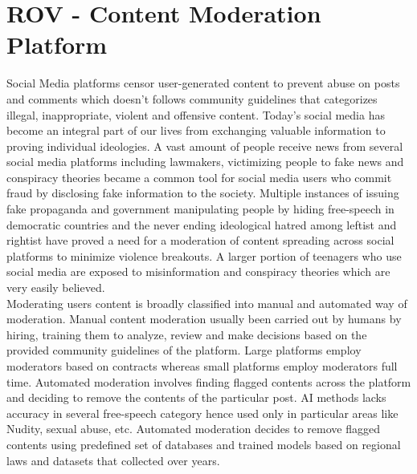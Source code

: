 \documentclass[conference]{IEEEtran}
\begin{document}
\section{\textbf{ROV - Content Moderation Platform}}

Social Media platforms censor user-generated content to prevent abuse on posts and comments which doesn't follows community guidelines that categorizes illegal, inappropriate, violent and offensive content.  Today's social media has become an integral part of our lives from exchanging valuable information to proving individual ideologies. A vast amount of people receive news from several social media platforms including lawmakers, victimizing people to fake news and conspiracy theories became a common tool for social media users who commit fraud by disclosing fake information to the society. Multiple instances of issuing fake propaganda and government manipulating people by hiding free-speech in democratic countries and the never ending ideological hatred among leftist and rightist have proved a need for a moderation of content spreading across social platforms to minimize violence breakouts. A larger portion of teenagers who use social media are exposed to misinformation and conspiracy theories which are very easily believed.\\

Moderating users content is broadly classified into manual and automated way of moderation. Manual content moderation usually been carried out by humans by hiring, training them to analyze, review and make decisions based on the provided community guidelines of the platform. Large platforms employ moderators based on contracts whereas small platforms employ moderators full time. Automated moderation involves finding flagged contents across the platform and deciding to remove the contents of the  particular post. AI methods lacks accuracy in several free-speech category hence used only in particular areas like Nudity, sexual abuse, etc. Automated moderation decides to remove flagged contents using predefined set of databases and trained models based on regional laws and datasets that collected over years.\\
\end{document}
